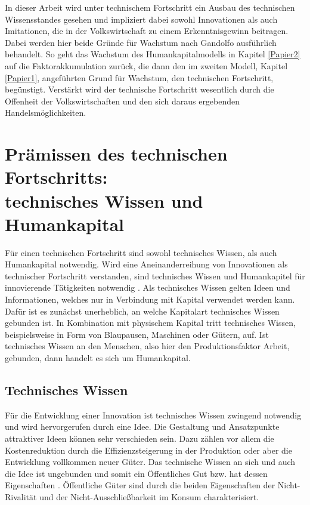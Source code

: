 In dieser Arbeit wird unter technischem Fortschritt ein Ausbau des technischen Wissensstandes gesehen und impliziert dabei sowohl Innovationen als auch Imitationen, die in der Volkswirtschaft zu einem Erkenntnisgewinn beitragen.\\
Dabei werden hier beide Gr{\"u}nde f{\"u}r Wachstum nach Gandolfo ausführlich behandelt. So geht das Wachstum des Humankapitalmodells in Kapitel \ref{Papier2} auf die Faktorakkumulation zur{\"u}ck, die dann den im zweiten Modell, Kapitel \ref{Papier1}, angef{\"u}hrten Grund f{\"u}r Wachstum, den technischen Fortschritt, beg{\"u}nstigt. Verstärkt wird der technische Fortschritt wesentlich durch die Offenheit der Volkswirtschaften und den sich daraus ergebenden Handelsmöglichkeiten. 


\section[Prämissen des technischen Fortschritts: technisches Wissen und Humankapital]{Prämissen des technischen Fortschritts: \\technisches Wissen und Humankapital }\label{sec:TechnischesWissenHumankapital}
Für einen technischen Fortschritt sind sowohl technisches Wissen, als auch Humankapital notwendig. Wird eine Aneinanderreihung von Innovationen als technischer Fortschritt verstanden, sind technisches Wissen und Humankapitel für innovierende Tätigkeiten notwendig \citep{Howitt.2005}. Als technisches Wissen gelten Ideen und Informationen, welches nur in Verbindung mit Kapital verwendet werden kann. Dafür ist es zunächst unerheblich, an welche Kapitalart technisches Wissen gebunden ist. In Kombination mit physischem Kapital tritt technisches Wissen, beispielsweise in Form von Blaupausen, Maschinen oder Gütern, auf. Ist technisches Wissen an den Menschen, also hier den Produktionsfaktor Arbeit, gebunden, dann handelt es sich um Humankapital.

\subsection{Technisches Wissen}\label{sec:techn. Wissen}
Für die Entwicklung einer Innovation ist technisches Wissen zwingend notwendig und wird hervorgerufen durch eine Idee. Die Gestaltung und Ansatzpunkte attraktiver Ideen können sehr verschieden sein. Dazu z{\"a}hlen vor allem die Kostenreduktion durch die Effizienzsteigerung in der Produktion oder aber die Entwicklung vollkommen neuer G{\"u}ter.\newline
Das technische Wissen an sich und auch die Idee ist ungebunden und somit ein {\"O}ffentliches Gut bzw. hat dessen Eigenschaften \citep{Arrow.1962, Nelson.1959}. Öffentliche Güter sind durch die beiden Eigenschaften der Nicht-Rivalit{\"a}t und der Nicht-Ausschlie{\ss}barkeit im Konsum charakterisiert.\newline 


